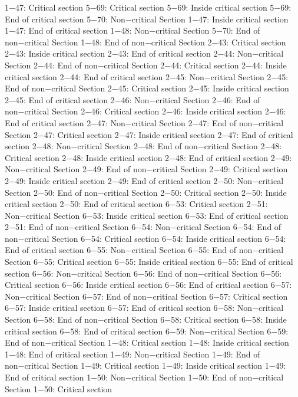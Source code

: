 1−47: Critical section
5−69: Critical section
5−69: Inside critical section
5−69: End of critical section
5−70: Non−critical Section
1−47: Inside critical section
1−47: End of critical section
1−48: Non−critical Section
5−70: End of non−critical Section
1−48: End of non−critical Section
2−43: Critical section
2−43: Inside critical section
2−43: End of critical section
2−44: Non−critical Section
2−44: End of non−critical Section
2−44: Critical section
2−44: Inside critical section
2−44: End of critical section
2−45: Non−critical Section
2−45: End of non−critical Section
2−45: Critical section
2−45: Inside critical section
2−45: End of critical section
2−46: Non−critical Section
2−46: End of non−critical Section
2−46: Critical section
2−46: Inside critical section
2−46: End of critical section
2−47: Non−critical Section
2−47: End of non−critical Section
2−47: Critical section
2−47: Inside critical section
2−47: End of critical section
2−48: Non−critical Section
2−48: End of non−critical Section
2−48: Critical section
2−48: Inside critical section
2−48: End of critical section
2−49: Non−critical Section
2−49: End of non−critical Section
2−49: Critical section
2−49: Inside critical section
2−49: End of critical section
2−50: Non−critical Section
2−50: End of non−critical Section
2−50: Critical section
2−50: Inside critical section
2−50: End of critical section
6−53: Critical section
2−51: Non−critical Section
6−53: Inside critical section
6−53: End of critical section
2−51: End of non−critical Section
6−54: Non−critical Section
6−54: End of non−critical Section
6−54: Critical section
6−54: Inside critical section
6−54: End of critical section
6−55: Non−critical Section
6−55: End of non−critical Section
6−55: Critical section
6−55: Inside critical section
6−55: End of critical section
6−56: Non−critical Section
6−56: End of non−critical Section
6−56: Critical section
6−56: Inside critical section
6−56: End of critical section
6−57: Non−critical Section
6−57: End of non−critical Section
6−57: Critical section
6−57: Inside critical section
6−57: End of critical section
6−58: Non−critical Section
6−58: End of non−critical Section
6−58: Critical section
6−58: Inside critical section
6−58: End of critical section
6−59: Non−critical Section
6−59: End of non−critical Section
1−48: Critical section
1−48: Inside critical section
1−48: End of critical section
1−49: Non−critical Section
1−49: End of non−critical Section
1−49: Critical section
1−49: Inside critical section
1−49: End of critical section
1−50: Non−critical Section
1−50: End of non−critical Section
1−50: Critical section
